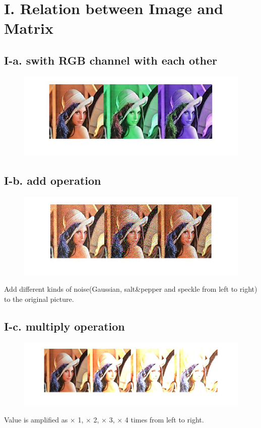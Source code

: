 \documentclass[twoside,a4paper]{article}
\begin{document}
\pagestyle{fancy}
\fancyhead{}


\section*{I. Relation between Image and Matrix}
\subsection*{I-a. swith RGB channel with each other}
\begin{figure}[H]
\centering
\includegraphics[width=7in]{channel.jpg}
\end{figure}
\subsection*{I-b. add operation}
\begin{figure}[H]
\centering
\includegraphics[width=7in]{addnoise.jpg}
\end{figure}
Add different kinds of noise(Gaussian, salt\&pepper and speckle from left to right) to the original picture.
\subsection*{I-c. multiply operation}
\begin{figure}[H]
\centering
\includegraphics[width=7in]{multiply.jpg}
\end{figure}
Value is amplified as $\times$ 1, $\times$ 2, $\times$ 3, $\times$ 4 times from left to right. 
\end{document}
